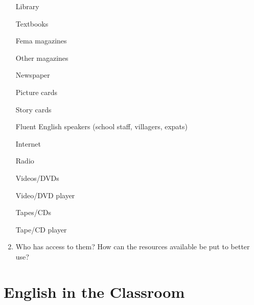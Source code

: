 \begin{enumerate}
\textbigcircle{} Library


\textbigcircle{} Textbooks


\textbigcircle{} Fema magazines


\textbigcircle{} Other magazines


\textbigcircle{} Newspaper


\textbigcircle{} Picture cards


\textbigcircle{} Story cards


\textbigcircle{} Fluent English speakers (school staff, villagers,
expats)


\textbigcircle{} Internet


\textbigcircle{} Radio


\textbigcircle{} Videos/DVDs


\textbigcircle{} Video/DVD player


\textbigcircle{} Tapes/CDs


\textbigcircle{} Tape/CD player

\item Who has access to them? How can the resources available be put to
better use? \\[60pt]
\end{enumerate}

\section{English in the Classroom}


